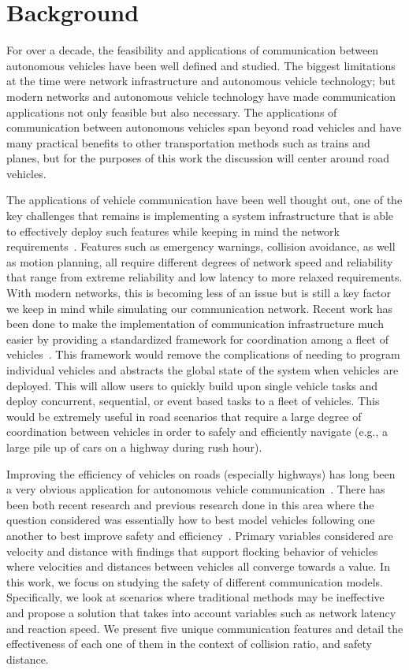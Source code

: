 \section{Background}

For over a decade, the feasibility and applications of communication between autonomous
vehicles have been well defined and studied. The biggest limitations at the time were
network infrastructure and autonomous vehicle technology; but modern networks and
autonomous vehicle technology have made communication applications not only feasible
but also necessary. The applications of communication between autonomous vehicles
span beyond road vehicles and have many practical benefits to other transportation methods
such as trains and planes, but for the purposes of this work the discussion will center
around road vehicles.

The applications of vehicle communication have been well thought out, one of the key
challenges that remains is implementing a system infrastructure that is able to
effectively deploy such features while keeping in mind the network requirements~\cite{willke2009survey}.
Features such as emergency warnings, collision avoidance, as well as motion planning,
all require different degrees of network speed and reliability that range from
extreme reliability and low latency to more relaxed requirements. With modern networks,
this is becoming less of an issue but is still a key factor we keep in mind while
simulating our communication network.
Recent work has been done to make
the implementation of communication infrastructure much easier by providing a standardized
framework for coordination among a fleet of vehicles~\cite{keila2018}.
This framework would remove
the complications of needing to program individual vehicles and abstracts the global
state of the system when vehicles are deployed. This will allow users to quickly build
upon single vehicle tasks and deploy concurrent, sequential, or event based tasks
to a fleet of vehicles. This would be extremely useful in road scenarios that require
a large degree of coordination between vehicles in order to safely and efficiently
navigate (e.g., a large pile up of cars on a highway during rush hour).

Improving the efficiency of vehicles on roads (especially highways) has long been a
very obvious application for autonomous vehicle communication~\cite{murray2007recent}.
There has been both recent research and previous research done in this area where the question
considered was essentially how to best model vehicles following one another to best
improve safety and efficiency~\cite{ou2017extended, tanner2003coordination}.
Primary variables considered are velocity
and distance with findings that support flocking behavior of vehicles where velocities
and distances between vehicles all converge towards a value.
In this work, we focus on studying the safety of different communication models.
Specifically, we look at scenarios where traditional methods may be ineffective and propose
a solution that takes into account variables such as network latency and reaction speed.
We present five unique communication features and detail the effectiveness of each one of them
in the context of collision ratio, and safety distance.
